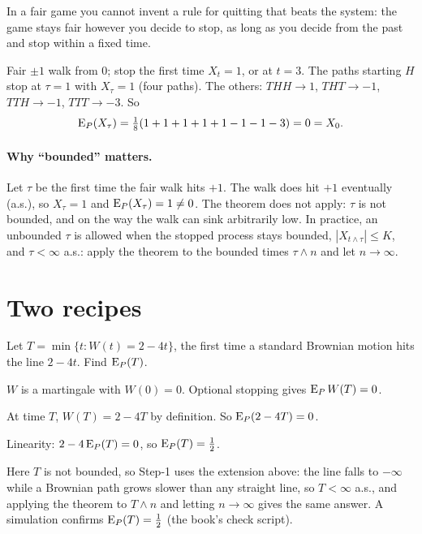\begin{intuition}
In a fair game you cannot invent a rule for quitting that beats the system: the game stays fair however you decide to stop, as long as you decide from the past and stop within a fixed time.
\end{intuition}

\begin{example}
Fair $\pm1$ walk from $0$; stop the first time $X_t=1$, or at $t=3$. The paths starting $H$ stop at $\tau=1$ with $X_\tau=1$ (four paths). The others: $THH\to1$, $THT\to-1$, $TTH\to-1$, $TTT\to-3$. So
\[
  \operatorname{E}_P(X_\tau)=\tfrac18(1+1+1+1+1-1-1-3)=0=X_0 .
\]
\end{example}

\paragraph{Why ``bounded'' matters.} Let $\tau$ be the first time the fair walk hits $+1$. The walk does hit $+1$ eventually (a.s.), so $X_\tau=1$ and $\operatorname{E}_P(X_\tau)=1\ne0$. The theorem does not apply: $\tau$ is not bounded, and on the way the walk can sink arbitrarily low. In practice, an unbounded $\tau$ is allowed when the stopped process stays bounded, $|X_{t\wedge\tau}|\le K$, and $\tau<\infty$ a.s.: apply the theorem to the bounded times $\tau\wedge n$ and let $n\to\infty$.

\section{Two recipes}

\begin{example}
\label{ex:line}
Let $T=\min\{t:W(t)=2-4t\}$, the first time a standard Brownian motion hits the line $2-4t$. Find $\operatorname{E}_P(T)$.
\begin{steps}
  \item $W$ is a martingale with $W(0)=0$. Optional stopping gives $\operatorname{E}_P W(T)=0$.
  \item At time $T$, $W(T)=2-4T$ by definition. So $\operatorname{E}_P(2-4T)=0$.
  \item Linearity: $2-4\operatorname{E}_P(T)=0$, so $\operatorname{E}_P(T)=\frac12$.
\end{steps}
\end{example}

Here $T$ is not bounded, so Step-1 uses the extension above: the line falls to $-\infty$ while a Brownian path grows slower than any straight line, so $T<\infty$ a.s., and applying the theorem to $T\wedge n$ and letting $n\to\infty$ gives the same answer. A simulation confirms $\operatorname{E}_P(T)=\frac12$ (the book's check script).

